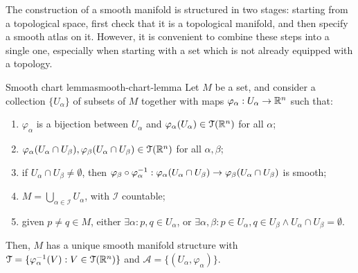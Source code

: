 The construction of a smooth manifold is structured in two stages: starting from a topological space, first check that it is a topological manifold, and then specify a smooth atlas on it. However, it is convenient to combine these steps into a single one, especially when starting with a set which is not already equipped with a topology.

\begin{lemma}{Smooth chart lemma}{smooth-chart-lemma}
  Let $ M $ be a set, and consider a collection $ \{U_\alpha\} $ of subsets of $ M $ together with maps $ \varphi_\alpha : U_\alpha \rightarrow \mathbb{R}^n $ such that:
  \begin{enumerate}
    \item \label{item:scl-1} $ \varphi_\alpha $ is a bijection between $ U_\alpha $ and $ \varphi_\alpha(U_\alpha) \in \EuScript{T}(\mathbb{R}^n) $ for all $ \alpha $;
    \item \label{item:scl-2} $ \varphi_\alpha(U_\alpha \cap U_\beta) , \varphi_\beta(U_\alpha \cap U_\beta) \in \EuScript{T}(\mathbb{R}^n) $ for all $ \alpha , \beta $;
    \item \label{item:scl-3} if $ U_\alpha \cap U_\beta \neq \emptyset $, then $ \varphi_\beta \circ \varphi_\alpha^{-1} : \varphi_\alpha(U_\alpha \cap U_\beta) \rightarrow \varphi_\beta(U_\alpha \cap U_\beta) $ is smooth;
    \item \label{item:scl-4} $ M = \bigcup_{\alpha \in \mathcal{I}} U_\alpha $, with $ \mathcal{I} $ countable;
    \item \label{item:scl-5} given $ p \neq q \in M $, either $ \exists \alpha : p,q \in U_\alpha $, or $ \exists \alpha , \beta : p \in U_\alpha , q \in U_\beta \land U_\alpha \cap U_\beta = \emptyset $.
  \end{enumerate}
  Then, $ M $ has a unique smooth manifold structure with $ \EuScript{T} = \{\varphi_\alpha^{-1}(V) : V \in \EuScript{T}(\mathbb{R}^n)\} $ and $ \mathcal{A} = \{(U_\alpha , \varphi_\alpha)\} $.
\end{lemma}

